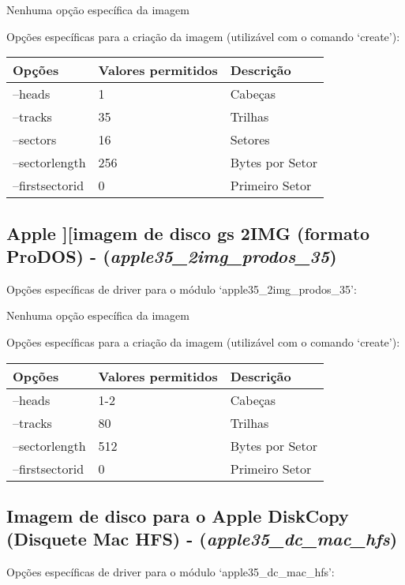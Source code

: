 \documentclass[letterpaper,10pt,brazil]{sphinxmanual}
\begin{document}
Nenhuma opção específica da imagem

Opções específicas para a criação da imagem (utilizável com o comando `create'):

\noindent\begin{tabulary}{\linewidth}{|L|L|L|}
\hline

Opções
&
Valores permitidos
&
Descrição
\\
\hline
--heads
&
1
&
Cabeças
\\
\hline
--tracks
&
35
&
Trilhas
\\
\hline
--sectors
&
16
&
Setores
\\
\hline
--sectorlength
&
256
&
Bytes por Setor
\\
\hline
--firstsectorid
&
0
&
Primeiro Setor
\\
\hline\end{tabulary}



\subsection{Apple {]}{[}imagem de disco gs 2IMG (formato ProDOS) - (\emph{apple35\_2img\_prodos\_35})}
\label{tools/imgtool:apple-imagem-de-disco-gs-2img-formato-prodos-apple35-2img-prodos-35}
Opções específicas de driver para o módulo `apple35\_2img\_prodos\_35':

Nenhuma opção específica da imagem

Opções específicas para a criação da imagem (utilizável com o comando `create'):

\noindent\begin{tabulary}{\linewidth}{|L|L|L|}
\hline

Opções
&
Valores permitidos
&
Descrição
\\
\hline
--heads
&
1-2
&
Cabeças
\\
\hline
--tracks
&
80
&
Trilhas
\\
\hline
--sectorlength
&
512
&
Bytes por Setor
\\
\hline
--firstsectorid
&
0
&
Primeiro Setor
\\
\hline\end{tabulary}



\subsection{Imagem de disco para o Apple DiskCopy (Disquete Mac HFS) - (\emph{apple35\_dc\_mac\_hfs})}
\label{tools/imgtool:imagem-de-disco-para-o-apple-diskcopy-disquete-mac-hfs-apple35-dc-mac-hfs}
Opções específicas de driver para o módulo `apple35\_dc\_mac\_hfs':
\end{document}
